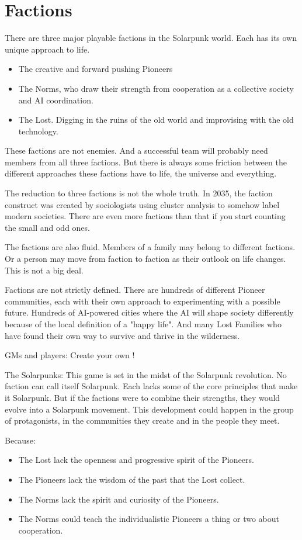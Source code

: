 \chapter{Factions}

There are three major playable factions in the Solarpunk world. Each has its own unique approach to life.

\begin{itemize}
    \item The creative and forward pushing Pioneers
    \item The Norms, who draw their strength from cooperation as a collective society and AI coordination.
    \item The Lost. Digging in the ruins of the old world and improvising with the old technology.
\end{itemize}

These factions are not enemies. And a successful team will probably need members from all three factions. But there is always some friction between the different approaches these factions have to life, the universe and everything.

The reduction to three factions is not the whole truth. In 2035, the faction construct was created by sociologists using cluster analysis to somehow label modern societies. There are even more factions than that if you start counting the small and odd ones.

The factions are also fluid. Members of a family may belong to different factions. Or a person may move from faction to faction as their outlook on life changes. This is not a big deal.

Factions are not strictly defined. There are hundreds of different Pioneer communities, each with their own approach to experimenting with a possible future. Hundreds of AI-powered cities where the AI will shape society differently because of the local definition of a "happy life". And many Lost Families who have found their own way to survive and thrive in the wilderness.

GMs and players: Create your own !

The Solarpunks: This game is set in the midst of the Solarpunk revolution. No faction can call itself Solarpunk. Each lacks some of the core principles that make it Solarpunk. But if the factions were to combine their strengths, they would evolve into a Solarpunk movement. This development could happen in the group of protagonists, in the communities they create and in the people they meet.

Because:

\begin{itemize}
\item The Lost lack the openness and progressive spirit of the Pioneers.
\item The Pioneers lack the wisdom of the past that the Lost collect.
\item The Norms lack the spirit and curiosity of the Pioneers.
\item The Norms could teach the individualistic Pioneers a thing or two about cooperation.
\end{itemize}
